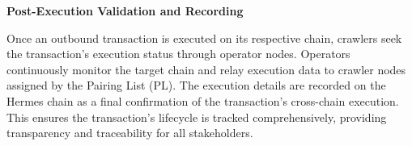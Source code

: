 \textbf{Post-Execution Validation and Recording}

Once an outbound transaction is executed on its respective chain, crawlers seek the transaction’s execution status through operator nodes. Operators continuously monitor the target chain and relay execution data to crawler nodes assigned by the Pairing List (PL). The execution details are recorded on the Hermes chain as a final confirmation of the transaction’s cross-chain execution. This ensures the transaction's lifecycle is tracked comprehensively, providing transparency and traceability for all stakeholders.